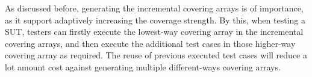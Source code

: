 \documentclass[conference]{IEEEtran}
\theoremstyle{definition}
\begin{document}
\begin{table}[htbp]
  \small
  \centering
  \caption{Experiment of Incremental covering array}
  \label{ica_example}
  \hspace{1cm}
\end{table}

As discussed before, generating the incremental covering arrays is of importance, as it support adaptively increasing the coverage strength. By this, when testing a SUT, testers can firstly execute the lowest-way covering array in the incremental covering arrays, and then execute the additional test cases in those higher-way covering array as required. The reuse of previous executed test cases will reduce a lot amount cost against generating multiple different-ways covering arrays.
\end{document}
